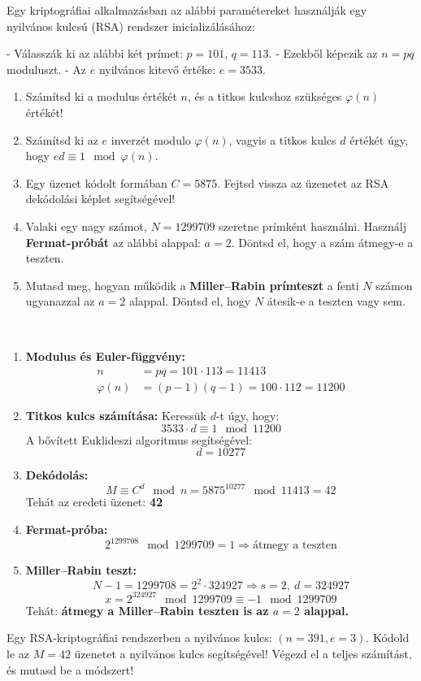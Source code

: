 \begin{extraproblem}
Egy kriptográfiai alkalmazásban az alábbi paramétereket használják
egy nyilvános kulcsú (RSA) rendszer inicializálásához:

- Válasszák ki az alábbi két prímet: $p=101$, $q=113$. - Ezekből
képezik az $n=pq$ moduluszt. - Az $e$ nyilvános kitevő értéke: $e=3533$.
\begin{enumerate}
\item Számítsd ki a modulus értékét $n$, és a titkos kulcshoz szükséges
$\varphi(n)$ értékét! 
\item Számítsd ki az $e$ inverzét modulo $\varphi(n)$, vagyis a titkos
kulcs $d$ értékét úgy, hogy $ed\equiv1\mod{\varphi}(n)$. 
\item Egy üzenet kódolt formában $C=5875$. Fejtsd vissza az üzenetet az
RSA dekódolási képlet segítségével! 
\item Valaki egy nagy számot, $N=1299709$ szeretne prímként használni.
Használj \textbf{Fermat-próbát} az alábbi alappal: $a=2$. Döntsd
el, hogy a szám átmegy-e a teszten. 
\item Mutasd meg, hogyan működik a \textbf{Miller--Rabin prímteszt} a fenti
$N$ számon ugyanazzal az $a=2$ alappal. Döntsd el, hogy $N$ átesik-e
a teszten vagy sem. 
\end{enumerate}
\end{extraproblem}

\begin{solution}
~
\begin{enumerate}
\item \textbf{Modulus és Euler-függvény:} 
\begin{align*}
n & =pq=101\cdot113=11413\\
\varphi(n) & =(p-1)(q-1)=100\cdot112=11200
\end{align*}
\item \textbf{Titkos kulcs számítása:} Keressük $d$-t úgy, hogy: 
\[
3533\cdot d\equiv1\mod 11200
\]
A bővített Euklideszi algoritmus segítségével: 
\[
d=10277
\]
\item \textbf{Dekódolás:} 
\[
M\equiv C^{d}\mod n=5875^{10277}\mod 11413=42
\]
Tehát az eredeti üzenet: \textbf{42}
\item \textbf{Fermat-próba:} 
\[
2^{1299708}\mod 1299709=1\Rightarrow\text{átmegy a teszten}
\]
\item \textbf{Miller--Rabin teszt:} 
\[
N-1=1299708=2^{2}\cdot324927\Rightarrow s=2,\ d=324927
\]
\[
x=2^{324927}\mod 1299709\equiv-1\mod 1299709
\]
Tehát: \textbf{átmegy a Miller--Rabin teszten is az $a=2$ alappal.} 
\end{enumerate}
\end{solution}
\begin{extraproblem}
Egy RSA-kriptográfiai rendszerben a nyilvános kulcs: $(n=391,e=3)$.
Kódold le az $M=42$ üzenetet a nyilvános kulcs segítségével! Végezd
el a teljes számítást, és mutasd be a módszert!
\end{extraproblem}

